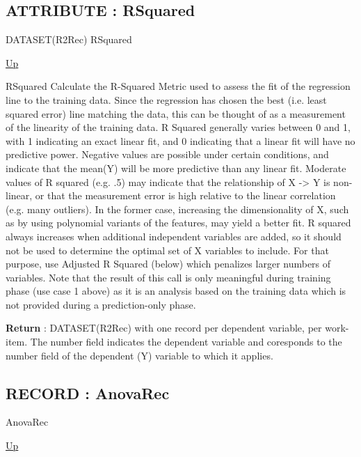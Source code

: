\subsection*{ATTRIBUTE : RSquared}
\hypertarget{ecldoc:linearregression.ols.rsquared}{}
\begin{minipage}[t]{\textwidth}
\begin{flushleft}
DATASET(R2Rec) RSquared 
\end{flushleft}
\end{minipage}
\hyperlink{ecldoc:linearregression.ols}{Up}

\par
RSquared Calculate the R-Squared Metric used to assess the fit of the regression line to the training data. Since the regression has chosen the best (i.e. least squared error) line matching the data, this can be thought of as a measurement of the linearity of the training data. R Squared generally varies between 0 and 1, with 1 indicating an exact linear fit, and 0 indicating that a linear fit will have no predictive power. Negative values are possible under certain conditions, and indicate that the mean(Y) will be more predictive than any linear fit. Moderate values of R squared (e.g. .5) may indicate that the relationship of X -> Y is non-linear, or that the measurement error is high relative to the linear correlation (e.g. many outliers). In the former case, increasing the dimensionality of X, such as by using polynomial variants of the features, may yield a better fit. R squared always increases when additional independent variables are added, so it should not be used to determine the optimal set of X variables to include. For that purpose, use Adjusted R Squared (below) which penalizes larger numbers of variables. Note that the result of this call is only meaningful during training phase (use case 1 above) as it is an analysis based on the training data which is not provided during a prediction-only phase.
\par
\textbf{Return} : DATASET(R2Rec) with one record per dependent variable, per work-item. The number field indicates the dependent variable and coresponds to the number field of the dependent (Y) variable to which it applies. \\
\subsection*{RECORD : AnovaRec}
\hypertarget{ecldoc:linearregression.ols.anovarec}{}
\begin{minipage}[t]{\textwidth}
\begin{flushleft}
 AnovaRec 
\end{flushleft}
\end{minipage}
\hyperlink{ecldoc:linearregression.ols}{Up}

